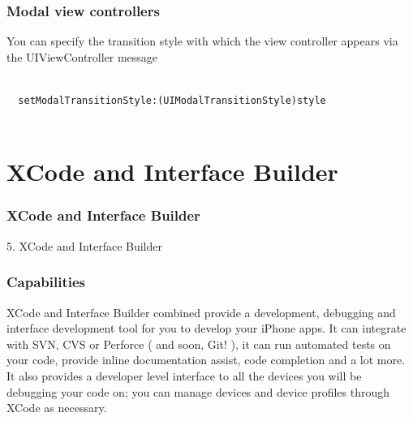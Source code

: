 \documentclass[10pt]{beamer}
\begin{document}
\begin{frame}[fragile]
  \frametitle{Modal view controllers}
  You can specify the transition style with which the view controller appears via the UIViewController message \begin{verbatim}
  
  setModalTransitionStyle:(UIModalTransitionStyle)style
            
  \end{verbatim}

\end{frame}

    

   
  

  
    
\section{XCode and Interface Builder}
\begin{frame}[fragile]
  \frametitle{XCode and Interface Builder}
  5. XCode and Interface Builder
\end{frame}


    
\begin{frame}[fragile]
  \frametitle{Capabilities}
  XCode and Interface Builder combined provide a development, debugging and interface development tool for you to develop your iPhone apps.  It can integrate with SVN, CVS or Perforce ( and soon, Git! ), it can run automated tests on your code, provide inline documentation assist, code completion and a lot more. It also provides a developer level interface to all the devices you will be debugging your code on; you can manage devices and device profiles through XCode as necessary.

\end{frame}
\end{document}

